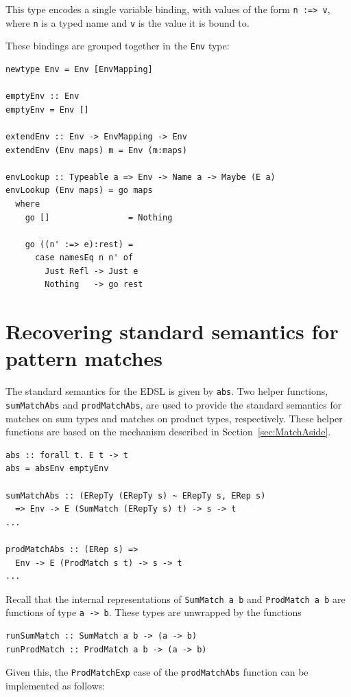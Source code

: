 \documentclass[runningheads, a4paper]{llncs}
\newcommand{\ttt}{\texttt}
\begin{document}
This type encodes a single variable binding, with values of the form
\ttt{n :=> v}, where \ttt{n} is a typed name and \ttt{v} is the value it is bound to.

These bindings are grouped together in the \ttt{Env} type:
\begin{lstlisting}
newtype Env = Env [EnvMapping]

emptyEnv :: Env
emptyEnv = Env []

extendEnv :: Env -> EnvMapping -> Env
extendEnv (Env maps) m = Env (m:maps)

envLookup :: Typeable a => Env -> Name a -> Maybe (E a)
envLookup (Env maps) = go maps
  where
    go []                = Nothing

    go ((n' :=> e):rest) =
      case namesEq n n' of
        Just Refl -> Just e
        Nothing   -> go rest
\end{lstlisting}


\section{Recovering standard semantics for pattern matches}
\label{sec:StdSemantics}

The standard semantics for the EDSL is given by \ttt{abs}. Two helper
functions, \ttt{sumMatchAbs} and \ttt{prodMatchAbs}, are used to provide
the standard semantics for matches on sum types and matches on product
types, respectively. These helper functions are based on the mechanism
described in Section~\ref{sec:MatchAside}.

\begin{lstlisting}
abs :: forall t. E t -> t
abs = absEnv emptyEnv

sumMatchAbs :: (ERepTy (ERepTy s) ~ ERepTy s, ERep s)
  => Env -> E (SumMatch (ERepTy s) t) -> s -> t
...

prodMatchAbs :: (ERep s) =>
  Env -> E (ProdMatch s t) -> s -> t
...
\end{lstlisting}

Recall that the internal representations of \verb|SumMatch a b| and \verb|ProdMatch a b|
are functions of type \verb|a -> b|. These types are unwrapped by the functions

\begin{lstlisting}
runSumMatch :: SumMatch a b -> (a -> b)
runProdMatch :: ProdMatch a b -> (a -> b)
\end{lstlisting}

Given this, the \verb|ProdMatchExp| case of the \verb|prodMatchAbs| function can be
implemented as follows:
\end{document}
